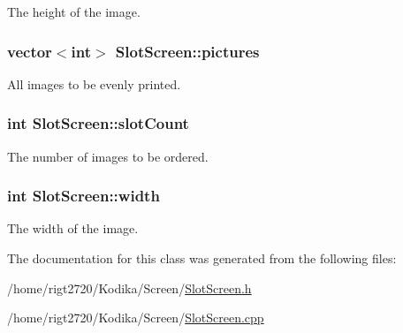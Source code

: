 The height of the image. 

\hypertarget{classSlotScreen_adff0222578ff70c1362880d2a8bede80}{
\subsubsection[{pictures}]{\setlength{\rightskip}{0pt plus 5cm}vector$<$int$>$ Slot\-Screen\-::pictures\hspace{0.3cm}{\ttfamily [private]}}}\label{classSlotScreen_adff0222578ff70c1362880d2a8bede80}


All images to be evenly printed. 

\hypertarget{classSlotScreen_adc177088622711869c8ddec331058a78}{
\subsubsection[{slot\-Count}]{\setlength{\rightskip}{0pt plus 5cm}int Slot\-Screen\-::slot\-Count\hspace{0.3cm}{\ttfamily [private]}}}\label{classSlotScreen_adc177088622711869c8ddec331058a78}


The number of images to be ordered. 

\hypertarget{classSlotScreen_a04705a45598ba5e7db362913bedc12b9}{
\subsubsection[{width}]{\setlength{\rightskip}{0pt plus 5cm}int Slot\-Screen\-::width\hspace{0.3cm}{\ttfamily [private]}}}\label{classSlotScreen_a04705a45598ba5e7db362913bedc12b9}


The width of the image. 



The documentation for this class was generated from the following files\-:\begin{DoxyCompactItemize}
\item 
/home/rigt2720/\-Kodika/\-Screen/\hyperlink{SlotScreen_8h}{Slot\-Screen.\-h}\item 
/home/rigt2720/\-Kodika/\-Screen/\hyperlink{SlotScreen_8cpp}{Slot\-Screen.\-cpp}\end{DoxyCompactItemize}
